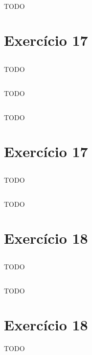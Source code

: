 \documentclass{article}
\begin{document}
\subsection{}
TODO

\section{Exercício 17}
\subsection{}
TODO
\subsection{}
TODO
\subsection{}
TODO

\section{Exercício 17}
\subsection{}
TODO
\subsection{}
TODO

\section{Exercício 18}
\subsection{}
TODO
\subsection{}
TODO

\section{Exercício 18}
TODO
\end{document}

